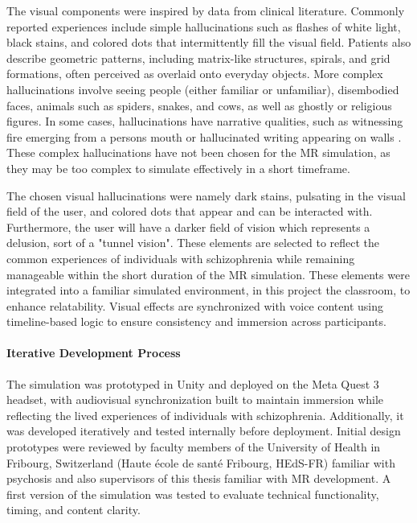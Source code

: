 The visual components were inspired by data from clinical literature. Commonly reported experiences include simple hallucinations such as flashes of white light, black stains, and colored dots that intermittently fill the visual field. Patients also describe geometric patterns, including matrix-like structures, spirals, and grid formations, often perceived as overlaid onto everyday objects. More complex hallucinations involve seeing people (either familiar or unfamiliar), disembodied faces, animals such as spiders, snakes, and cows, as well as ghostly or religious figures. In some cases, hallucinations have narrative qualities, such as witnessing fire emerging from a persons mouth or hallucinated writing appearing on walls \cite{Vanommen2019,Silverstein2021}. These complex hallucinations have not been chosen for the MR simulation, as they may be too complex to simulate effectively in a short timeframe.

\vspace{1em}

The chosen visual hallucinations were namely dark stains, pulsating in the visual field of the user, and colored dots that appear and can be interacted with. Furthermore, the user will have a darker field of vision which represents a delusion, sort of a "tunnel vision". These elements are selected to reflect the common experiences of individuals with schizophrenia while remaining manageable within the short duration of the MR simulation.  These elements were integrated into a familiar simulated environment, in this project the classroom, to enhance relatability. Visual effects are synchronized with voice content using timeline-based logic to ensure consistency and immersion across participants.

\paragraph{Iterative Development Process}

The simulation was prototyped in Unity and deployed on the Meta Quest 3 headset, with audiovisual synchronization built to maintain immersion while reflecting the lived experiences of individuals with schizophrenia. Additionally, it was developed iteratively and tested internally before deployment. Initial design prototypes were reviewed by faculty members of the University of Health in Fribourg, Switzerland (Haute école de santé Fribourg, HEdS-FR) familiar with psychosis and also supervisors of this thesis familiar with MR development. A first version of the simulation was tested to evaluate technical functionality, timing, and content clarity.

